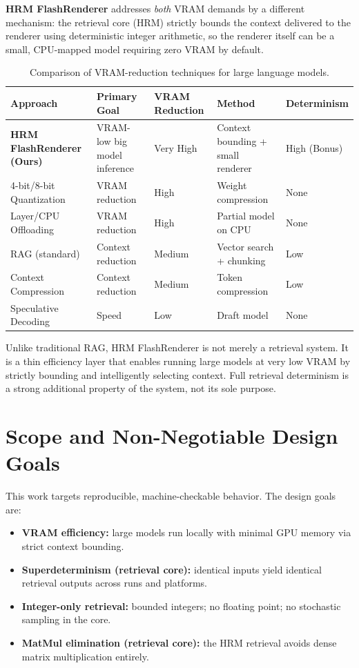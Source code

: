 \documentclass[11pt,a4paper]{article}
\theoremstyle{definition}
\theoremstyle{plain}
\theoremstyle{remark}
\begin{document}
\textbf{HRM FlashRenderer} addresses \emph{both} VRAM demands by a different mechanism:
the retrieval core (HRM) strictly bounds the context delivered to the renderer
using deterministic integer arithmetic, so the renderer itself can be a small,
CPU-mapped model requiring zero VRAM by default.

\begin{table}[htb]
\centering
\caption{Comparison of VRAM-reduction techniques for large language models.}
\label{tab:comparison}
\renewcommand{\arraystretch}{1.15}
\begin{tabular}{@{}p{3.2cm}p{2.4cm}p{1.6cm}p{2.8cm}p{1.8cm}@{}}
\toprule
\textbf{Approach} & \textbf{Primary Goal} & \textbf{VRAM Reduction} & \textbf{Method} & \textbf{Determinism} \\
\midrule
\textbf{HRM FlashRenderer (Ours)} & VRAM-low big model inference & Very High & Context bounding + small renderer & High (Bonus) \\
4-bit/8-bit Quantization & VRAM reduction & High & Weight compression & None \\
Layer/CPU Offloading & VRAM reduction & High & Partial model on CPU & None \\
RAG (standard) & Context reduction & Medium & Vector search + chunking & Low \\
Context Compression & Context reduction & Medium & Token compression & Low \\
Speculative Decoding & Speed & Low & Draft model & None \\
\bottomrule
\end{tabular}
\end{table}

\noindent Unlike traditional RAG, HRM FlashRenderer is not merely a retrieval system.
It is a thin efficiency layer that enables running large models at very low VRAM
by strictly bounding and intelligently selecting context.
Full retrieval determinism is a strong additional property of the system, not its sole purpose.

\section{Scope and Non-Negotiable Design Goals}
This work targets reproducible, machine-checkable behavior.
The design goals are:

\begin{itemize}
  \item \textbf{VRAM efficiency:} large models run locally with minimal GPU memory via strict context bounding.
  \item \textbf{Superdeterminism (retrieval core):} identical inputs yield identical retrieval outputs across runs and platforms.
  \item \textbf{Integer-only retrieval:} bounded integers; no floating point; no stochastic sampling in the core.
  \item \textbf{MatMul elimination (retrieval core):} the HRM retrieval avoids dense matrix multiplication entirely.
\end{itemize}
\end{document}
